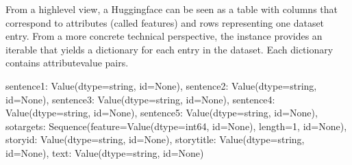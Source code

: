 \documentclass[letterpaper,10pt,english]{jupyterBook}
\begin{document}
\sphinxAtStartPar
From a high\sphinxhyphen{}level view, a Huggingface  can be seen as a table with columns that correspond to attributes (called features) and rows representing one dataset entry.
From a more concrete technical perspective, the \sphinxhyphen{}instance provides an iterable that yields a dictionary for each entry in the dataset. Each dictionary contains attribute\sphinxhyphen{}value pairs.
\begin{sphinxVerbatimInput}

\begin{sphinxVerbatim}[commandchars=\\\{\}]
   

  
\PYG{p}{[}\PYG{p}{]}
\end{sphinxVerbatim}
\end{sphinxVerbatimInput}
\begin{sphinxVerbatimOutput}

\begin{sphinxVerbatim}[commandchars=\\\{\}]
\PYGZob{}\PYGZsq{}sentence1\PYGZsq{}: Value(dtype=\PYGZsq{}string\PYGZsq{}, id=None),
 \PYGZsq{}sentence2\PYGZsq{}: Value(dtype=\PYGZsq{}string\PYGZsq{}, id=None),
 \PYGZsq{}sentence3\PYGZsq{}: Value(dtype=\PYGZsq{}string\PYGZsq{}, id=None),
 \PYGZsq{}sentence4\PYGZsq{}: Value(dtype=\PYGZsq{}string\PYGZsq{}, id=None),
 \PYGZsq{}sentence5\PYGZsq{}: Value(dtype=\PYGZsq{}string\PYGZsq{}, id=None),
 \PYGZsq{}so\PYGZus{}targets\PYGZsq{}: Sequence(feature=Value(dtype=\PYGZsq{}int64\PYGZsq{}, id=None), length=\PYGZhy{}1, id=None),
 \PYGZsq{}storyid\PYGZsq{}: Value(dtype=\PYGZsq{}string\PYGZsq{}, id=None),
 \PYGZsq{}storytitle\PYGZsq{}: Value(dtype=\PYGZsq{}string\PYGZsq{}, id=None),
 \PYGZsq{}text\PYGZsq{}: Value(dtype=\PYGZsq{}string\PYGZsq{}, id=None)\PYGZcb{}
\end{sphinxVerbatim}
\end{sphinxVerbatimOutput}
\begin{sphinxVerbatimInput}

\begin{sphinxVerbatim}[commandchars=\\\{\}]
\PYG{p}{[}\PYG{p}{]}\PYG{p}{[}\PYG{p}{]}
\end{sphinxVerbatim}
\end{sphinxVerbatimInput}
\end{document}
